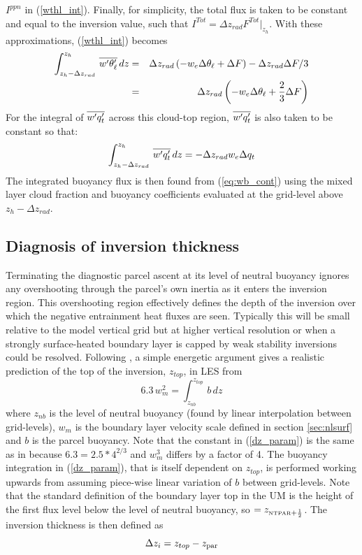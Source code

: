 \documentclass{UMDP_article}
\begin{document}
$I^{ppn}$ in (\ref{wthl_int}).  Finally, for simplicity, the total
flux is taken to be constant and equal to the inversion value, such
that $I^{Tot} = \Delta z_{rad} F^{Tot}|_{z_h}$.  With these
approximations, (\ref{wthl_int}) becomes
\begin{eqnarray*}
  \int_{z_h-\Delta z_{rad}}^{z_h} \, \overline{w'\theta_{\ell}'} \, dz  & = & 
  \Delta  z_{rad} \left( -w_e \Delta \theta_{\ell} + \Delta F \right) 
  - \Delta z_{rad} \Delta F / 3 \\
  & = & \Delta  z_{rad} \left( -w_e \Delta \theta_{\ell} + \frac{2}{3} \Delta F \right) 
\end{eqnarray*}
For the integral of $\overline{w'q_t'}$ across this cloud-top region, $\overline{w'q_t'}$ is
also taken to be constant so that:
\begin{equation}
  \int_{z_h-\Delta z_{rad}}^{z_h} \, \overline{w'q_t'} \, dz = 
  - \Delta  z_{rad} w_e \Delta q_t
\end{equation}
The integrated buoyancy flux is then found from (\ref{eq:wb_cont})
using the mixed layer cloud fraction and buoyancy coefficients
evaluated at the grid-level above $ z_h -\Delta z_{rad} $.

\subsection{Diagnosis of inversion thickness}
\label{sec:dzi}

Terminating the diagnostic parcel ascent at its level of neutral
buoyancy ignores any overshooting through the parcel's own inertia as
it enters the inversion region.  This overshooting region effectively
defines the depth of the inversion over which the negative entrainment
heat fluxes are seen.  Typically this will be small relative to the
model vertical grid but at higher vertical resolution or when a
strongly surface-heated boundary layer is capped by weak stability
inversions could be resolved.  Following \cite{beare2008}, a simple
energetic argument gives a realistic prediction of the top of the
inversion, $z_{top}$, in LES from
\begin{equation}
  6.3 \, w_m^2  =  \int_{z_{nb}}^{z_{top}} \, b \, dz
  \label{dz_param}
\end{equation}
where $z_{nb}$ is the level of neutral buoyancy (found by linear
interpolation between grid-levels), $w_m$ is the boundary layer
velocity scale defined in section \ref{sec:nlsurf} and $b$ is the
parcel buoyancy.  Note that the constant in (\ref{dz_param}) is the
same as in \cite{beare2008} because $6.3 = 2.5 * 4^{2/3}$ and $w_m^3$
differs by a factor of 4.  The buoyancy integration in
(\ref{dz_param}), that is itself dependent on $z_{top}$, is performed
working upwards from \zhpar assuming piece-wise linear variation of
$b$ between grid-levels.  Note that the standard definition of the
boundary layer top in the UM is the height of the first flux level
below the level of neutral buoyancy, so
\zhpar$=z_{\mbox{\tiny \rm NTPAR}+\frac{1}{2}}$.  The inversion thickness is then
defined as
\begin{equation}
  \Delta z_i  =  z_{top} -z_{\rm par}
  \label{dz_definition}
\end{equation}
\end{document}
